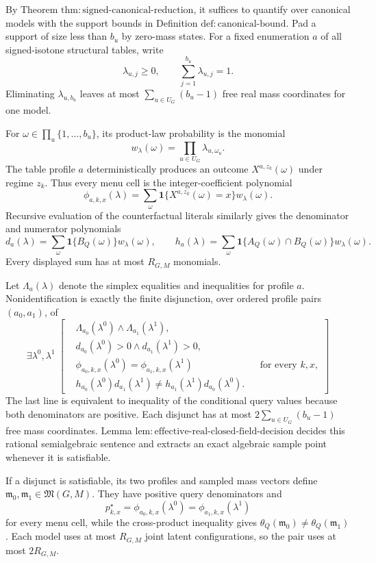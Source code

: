 By Theorem \(\mathrm{thm:signed\text{-}canonical\text{-}reduction}\), it suffices to quantify over canonical models with the support bounds in Definition \(\mathrm{def:canonical\text{-}bound}\).  Pad a support of size less than \(b_u\) by zero-mass states.  For a fixed enumeration \(a\) of all signed-isotone structural tables, write
\[
 \lambda_{u,j}\ge0,\qquad
 \sum_{j=1}^{b_u}\lambda_{u,j}=1.
\]
Eliminating \(\lambda_{u,b_u}\) leaves at most \(\sum_{u\in U_G}(b_u-1)\) free real mass coordinates for one model.

For \(\omega\in\prod_u\{1,\ldots,b_u\}\), its product-law probability is the monomial
\[
 w_\lambda(\omega)=\prod_{u\in U_G}\lambda_{u,\omega_u}.
\]
The table profile \(a\) deterministically produces an outcome \(X^{a,z_k}(\omega)\) under regime \(z_k\).  Thus every menu cell is the integer-coefficient polynomial
\[
 \phi_{a,k,x}(\lambda)
 =\sum_{\omega}
 \mathbf 1\{X^{a,z_k}(\omega)=x\}w_\lambda(\omega).
\]
Recursive evaluation of the counterfactual literals similarly gives the denominator and numerator polynomials
\[
 d_a(\lambda)=\sum_{\omega}\mathbf 1\{B_Q(\omega)\}w_\lambda(\omega),
 \qquad
 h_a(\lambda)=\sum_{\omega}\mathbf 1\{A_Q(\omega)\cap B_Q(\omega)\}w_\lambda(\omega).
\]
Every displayed sum has at most \(R_{G,M}\) monomials.

Let \(\Lambda_a(\lambda)\) denote the simplex equalities and inequalities for profile \(a\).  Nonidentification is exactly the finite disjunction, over ordered profile pairs \((a_0,a_1)\), of
\[
 \exists\lambda^0,\lambda^1\;\left[
 \begin{aligned}
 &\Lambda_{a_0}(\lambda^0)\wedge\Lambda_{a_1}(\lambda^1),\\
 &d_{a_0}(\lambda^0)>0\wedge d_{a_1}(\lambda^1)>0,\\
 &\phi_{a_0,k,x}(\lambda^0)=\phi_{a_1,k,x}(\lambda^1)
       &&\text{for every \(k,x\)},\\
 &h_{a_0}(\lambda^0)d_{a_1}(\lambda^1)
   \ne h_{a_1}(\lambda^1)d_{a_0}(\lambda^0).
 \end{aligned}\right]
\]
The last line is equivalent to inequality of the conditional query values because both denominators are positive.  Each disjunct has at most \(2\sum_{u\in U_G}(b_u-1)\) free mass coordinates.  Lemma \(\mathrm{lem:effective\text{-}real\text{-}closed\text{-}field\text{-}decision}\) decides this rational semialgebraic sentence and extracts an exact algebraic sample point whenever it is satisfiable.

If a disjunct is satisfiable, its two profiles and sampled mass vectors define \(\mathfrak m_0,\mathfrak m_1\in\mathfrak M(G,M)\).  They have positive query denominators and
\[
 p^\star_{k,x}
 =\phi_{a_0,k,x}(\lambda^0)
 =\phi_{a_1,k,x}(\lambda^1)
\]
for every menu cell, while the cross-product inequality gives \(\theta_Q(\mathfrak m_0)\ne\theta_Q(\mathfrak m_1)\).  Each model uses at most \(R_{G,M}\) joint latent configurations, so the pair uses at most \(2R_{G,M}\).

